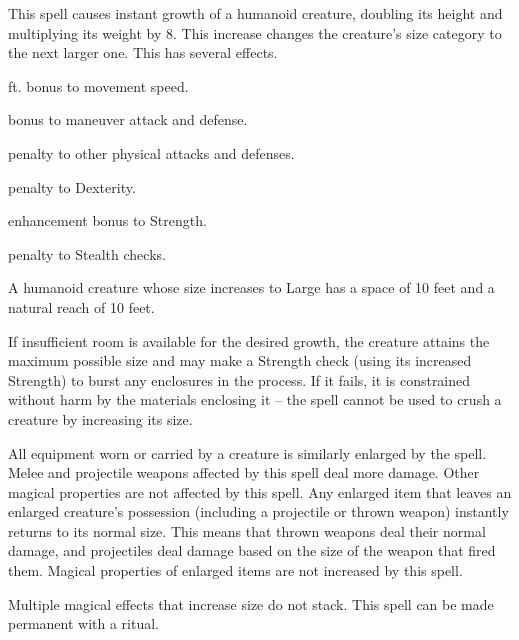 \spellrng{\rngclose}
\begin{spelleffect}
  This spell causes instant growth of a humanoid creature, doubling its height and multiplying its weight by 8. This increase changes the creature's size category to the next larger one. This has several effects.
  \begin{itemize*} 
    \item {} ft. bonus to movement speed.
    \item {} bonus to maneuver attack and defense.
    \item {} penalty to other physical attacks and defenses.
    \item {} penalty to Dexterity.
    \item {} enhancement bonus to Strength.
    \item {} penalty to Stealth checks.
  \end{itemize*}
  \par A humanoid creature whose size increases to Large has a space of 10 feet and a natural reach of 10 feet.
  \par If insufficient room is available for the desired growth, the creature attains the maximum possible size and may make a Strength check (using its increased Strength) to burst any enclosures in the process. If it fails, it is constrained without harm by the materials enclosing it -- the spell cannot be used to crush a creature by increasing its size.
  \par All equipment worn or carried by a creature is similarly enlarged by the spell. Melee and projectile weapons affected by this spell deal more damage. Other magical properties are not affected by this spell. Any enlarged item that leaves an enlarged creature's possession (including a projectile or thrown weapon) instantly returns to its normal size. This means that thrown weapons deal their normal damage, and projectiles deal damage based on the size of the weapon that fired them. Magical properties of enlarged items are not increased by this spell.
\end{spelleffect}
\begin{spellnotes}
  Multiple magical effects that increase size do not stack. This spell can be made permanent with a  ritual.
\end{spellnotes}

